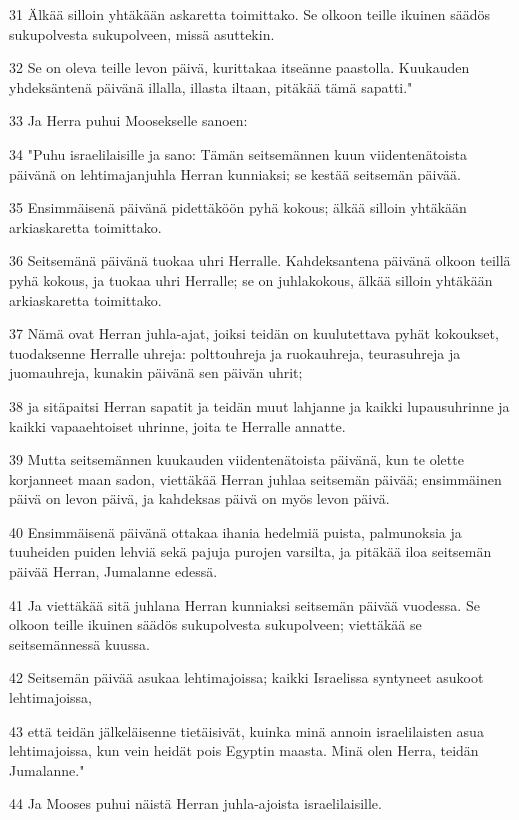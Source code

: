 \par 31 Älkää silloin yhtäkään askaretta toimittako. Se olkoon teille ikuinen säädös sukupolvesta sukupolveen, missä asuttekin.
\par 32 Se on oleva teille levon päivä, kurittakaa itseänne paastolla. Kuukauden yhdeksäntenä päivänä illalla, illasta iltaan, pitäkää tämä sapatti."
\par 33 Ja Herra puhui Moosekselle sanoen:
\par 34 "Puhu israelilaisille ja sano: Tämän seitsemännen kuun viidentenätoista päivänä on lehtimajanjuhla Herran kunniaksi; se kestää seitsemän päivää.
\par 35 Ensimmäisenä päivänä pidettäköön pyhä kokous; älkää silloin yhtäkään arkiaskaretta toimittako.
\par 36 Seitsemänä päivänä tuokaa uhri Herralle. Kahdeksantena päivänä olkoon teillä pyhä kokous, ja tuokaa uhri Herralle; se on juhlakokous, älkää silloin yhtäkään arkiaskaretta toimittako.
\par 37 Nämä ovat Herran juhla-ajat, joiksi teidän on kuulutettava pyhät kokoukset, tuodaksenne Herralle uhreja: polttouhreja ja ruokauhreja, teurasuhreja ja juomauhreja, kunakin päivänä sen päivän uhrit;
\par 38 ja sitäpaitsi Herran sapatit ja teidän muut lahjanne ja kaikki lupausuhrinne ja kaikki vapaaehtoiset uhrinne, joita te Herralle annatte.
\par 39 Mutta seitsemännen kuukauden viidentenätoista päivänä, kun te olette korjanneet maan sadon, viettäkää Herran juhlaa seitsemän päivää; ensimmäinen päivä on levon päivä, ja kahdeksas päivä on myös levon päivä.
\par 40 Ensimmäisenä päivänä ottakaa ihania hedelmiä puista, palmunoksia ja tuuheiden puiden lehviä sekä pajuja purojen varsilta, ja pitäkää iloa seitsemän päivää Herran, Jumalanne edessä.
\par 41 Ja viettäkää sitä juhlana Herran kunniaksi seitsemän päivää vuodessa. Se olkoon teille ikuinen säädös sukupolvesta sukupolveen; viettäkää se seitsemännessä kuussa.
\par 42 Seitsemän päivää asukaa lehtimajoissa; kaikki Israelissa syntyneet asukoot lehtimajoissa,
\par 43 että teidän jälkeläisenne tietäisivät, kuinka minä annoin israelilaisten asua lehtimajoissa, kun vein heidät pois Egyptin maasta. Minä olen Herra, teidän Jumalanne."
\par 44 Ja Mooses puhui näistä Herran juhla-ajoista israelilaisille.

